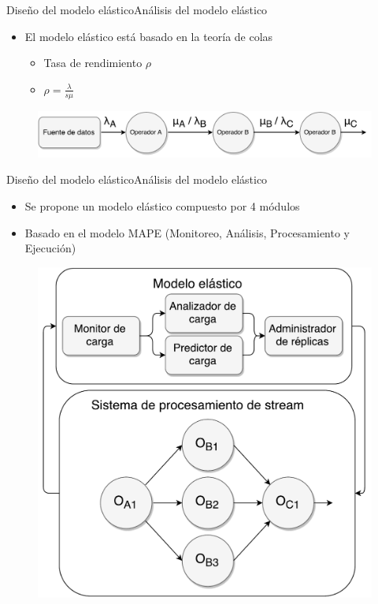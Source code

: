 \begin{frame}{Diseño del modelo elástico}{Análisis del modelo elástico}
\begin{itemize}
\item El modelo elástico está basado en la teoría de colas
\begin{itemize}
	\item Tasa de rendimiento $\rho$
	\item $\rho = \frac{\lambda}{s \mu}$
\end{itemize}	
\end{itemize}

\begin{figure}[!hb]
	\centering
	\includegraphics[scale=0.45]{images/AnalisisTeoriaColas.pdf}
\end{figure}

\end{frame}

\begin{frame}{Diseño del modelo elástico}{Análisis del modelo elástico}
\begin{itemize}
	\item Se propone un modelo elástico compuesto por 4 módulos
	\item Basado en el modelo MAPE (Monitoreo, Análisis, Procesamiento y Ejecución)
\end{itemize}
\begin{figure}[ht!]
  \centering
    \includegraphics[scale=0.3]{images/Diagrama.pdf}
\end{figure}
\end{frame}

